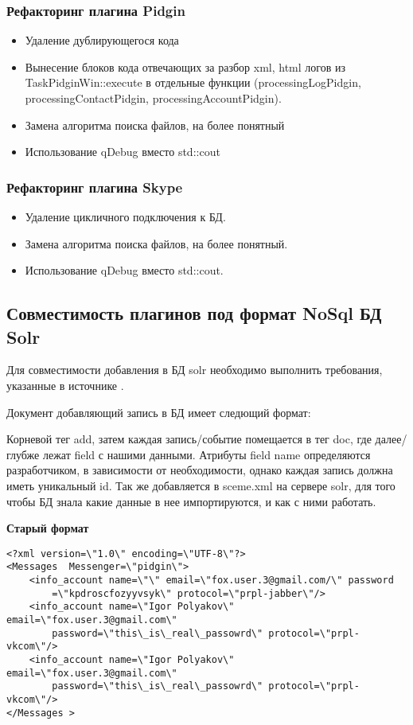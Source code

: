 \subsubsection{Рефакторинг плагина Pidgin}

\begin{itemize}
\item Удаление дублирующегося кода
\item Вынесение блоков кода отвечающих за разбор xml, html логов из TaskPidginWin::execute в отдельные функции (processingLogPidgin, processingContactPidgin, processingAccountPidgin).
\item Замена алгоритма поиска файлов, на более понятный
\item Использование qDebug вместо std::cout
\end{itemize}

\subsubsection{Рефакторинг плагина Skype}

\begin{itemize}
\item Удаление цикличного подключения к БД.
\item Замена алгоритма поиска файлов, на более понятный.
\item Использование qDebug вместо std::cout.
\end{itemize}

\subsection{Совместимость плагинов под формат NoSql БД Solr}

Для совместимости добавления в БД solr необходимо выполнить требования, указанные в источнике \cite{updatesolr}.

Документ добавляющий запись в БД имеет следющий формат: 

Корневой тег add,  затем каждая запись/событие помещается в тег doc, где далее/глубже лежат field с нашими  данными. Атрибуты field name определяются разработчиком, в зависимости от необходимости, однако каждая запись должна иметь уникальный id. Так же добавляется в sceme.xml  на сервере solr, для того чтобы БД знала какие данные в нее импортируются, и как с ними работать.

\textbf{Старый формат}

\begin{lstlisting}
<?xml version=\"1.0\" encoding=\"UTF-8\"?>
<Messages  Messenger=\"pidgin\">
    <info_account name=\"\" email=\"fox.user.3@gmail.com/\" password
        =\"kpdroscfozyyvsyk\" protocol=\"prpl-jabber\"/>
    <info_account name=\"Igor Polyakov\" email=\"fox.user.3@gmail.com\"
        password=\"this\_is\_real\_passowrd\" protocol=\"prpl-vkcom\"/>
    <info_account name=\"Igor Polyakov\" email=\"fox.user.3@gmail.com\"
        password=\"this\_is\_real\_passowrd\" protocol=\"prpl-vkcom\"/>
</Messages >
\end{lstlisting}


